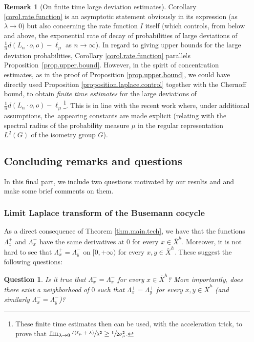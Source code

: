 \documentclass[JEP,XML,SOM,Unicode,published]{cedram}
\theoremstyle{plain}
\newtheorem{question}[theorem]{Question}
\theoremstyle{definition}
\newtheorem{remark}[theorem]{Remark}
\begin{document}
\begin{remark}[On finite time large deviation estimates]
Corollary \ref{corol.rate.function} is an asymptotic statement obviously in its expression (as $\lambda \to 0$) but also concerning the rate function $I$ itself (which controls, from below and above, the exponential rate of decay of probabilities of large deviations of $\frac{1}{n}d(L_n \cdot o,o)-\ell_\mu$ as $n \to \infty$). In regard to giving upper bounds for the large deviation probabilities, Corollary \ref{corol.rate.function} parallels Proposition~\ref{prop.upper.bound}. However, in the spirit of concentration estimates, as in the proof of Proposition \ref{prop.upper.bound}, we could have directly used Proposition \ref{proposition.laplace.control} together with the Chernoff bound, to obtain \textit{finite time estimates} for the large deviations of $\frac{1}{n}d(L_n \cdot o,o)-\ell_\mu$\footnote{These finite time estimates then can be used, with the acceleration trick, to prove that $\lim_{\lambda \to 0}\sfrac{I(\ell_\mu+\lambda)}{\lambda^2} \geq \sfrac{1}{2\sigma_\mu^2}$.}. This is in line with the recent work \cite{aoun-sert} where, under additional assumptions, the~appearing constants are made explicit (\eg relating with the spectral radius of the probability measure $\mu$ in the regular representation $L^2(G)$ of the isometry group $G$).
\end{remark}

\subsection{Concluding remarks and questions}\label{subsec.questions}
In this final part, we include two questions motivated by our results and and make some brief comments on them.
\subsubsection{Limit Laplace transform of the Busemann cocycle}
As a direct consequence of Theorem \ref{thm.main.tech}, we have that the functions $\Lambda_x^+$ and $\Lambda_x^-$ have the same derivatives at $0$ for every $x\in \overline{X}^h$. Moreover, it is not hard to see that $\Lambda_x^+=\Lambda_y^-$ on $[0,+\infty)$ for every $x,y \in \overline{X}^h$. These suggest the following questions:

\begin{question}\label{question}
Is it true that $\Lambda_x^+=\Lambda_x^-$ for every $x\in \overline{X}^h$? More importantly, does there exist a neighborhood of $0$ such that $\Lambda_x^+=\Lambda_y^+$ for every $x,y\in \overline{X}^h$ (and similarly $\Lambda_x^-=\Lambda_y^-$)?
\end{question}
\end{document}
